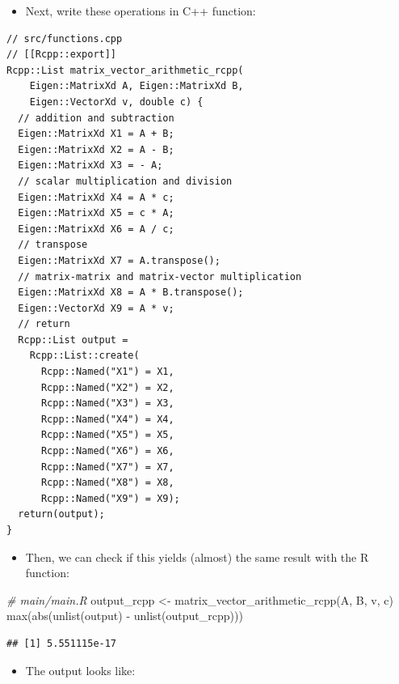 \documentclass[
]{book}
\newenvironment{Shaded}{\begin{snugshade}}{\end{snugshade}}
\newcommand{\CommentTok}[1]{\textcolor[rgb]{0.56,0.35,0.01}{\textit{#1}}}
\newcommand{\FunctionTok}[1]{\textcolor[rgb]{0.00,0.00,0.00}{#1}}
\newcommand{\NormalTok}[1]{#1}
\newcommand{\OtherTok}[1]{\textcolor[rgb]{0.56,0.35,0.01}{#1}}
\newcommand{\SpecialCharTok}[1]{\textcolor[rgb]{0.00,0.00,0.00}{#1}}
\providecommand{\tightlist}{%
  \setlength{\itemsep}{0pt}\setlength{\parskip}{0pt}}
\begin{document}
\begin{itemize}
\tightlist
\item
  Next, write these operations in C++ function:
\end{itemize}

\begin{verbatim}
// src/functions.cpp
// [[Rcpp::export]]
Rcpp::List matrix_vector_arithmetic_rcpp(
    Eigen::MatrixXd A, Eigen::MatrixXd B, 
    Eigen::VectorXd v, double c) {
  // addition and subtraction
  Eigen::MatrixXd X1 = A + B;
  Eigen::MatrixXd X2 = A - B;
  Eigen::MatrixXd X3 = - A;
  // scalar multiplication and division
  Eigen::MatrixXd X4 = A * c;
  Eigen::MatrixXd X5 = c * A;
  Eigen::MatrixXd X6 = A / c;
  // transpose
  Eigen::MatrixXd X7 = A.transpose();
  // matrix-matrix and matrix-vector multiplication
  Eigen::MatrixXd X8 = A * B.transpose();
  Eigen::VectorXd X9 = A * v;
  // return 
  Rcpp::List output = 
    Rcpp::List::create(
      Rcpp::Named("X1") = X1,
      Rcpp::Named("X2") = X2,
      Rcpp::Named("X3") = X3,
      Rcpp::Named("X4") = X4,
      Rcpp::Named("X5") = X5,
      Rcpp::Named("X6") = X6,
      Rcpp::Named("X7") = X7,
      Rcpp::Named("X8") = X8,
      Rcpp::Named("X9") = X9);
  return(output);
}
\end{verbatim}

\begin{itemize}
\tightlist
\item
  Then, we can check if this yields (almost) the same result with the R function:
\end{itemize}

\begin{Shaded}
\begin{Highlighting}[]
\CommentTok{\# main/main.R}
\NormalTok{output\_rcpp }\OtherTok{\textless{}{-}} \FunctionTok{matrix\_vector\_arithmetic\_rcpp}\NormalTok{(A, B, v, c)}
\FunctionTok{max}\NormalTok{(}\FunctionTok{abs}\NormalTok{(}\FunctionTok{unlist}\NormalTok{(output) }\SpecialCharTok{{-}} \FunctionTok{unlist}\NormalTok{(output\_rcpp)))}
\end{Highlighting}
\end{Shaded}

\begin{verbatim}
## [1] 5.551115e-17
\end{verbatim}

\begin{itemize}
\tightlist
\item
  The output looks like:
\end{itemize}
\end{document}
